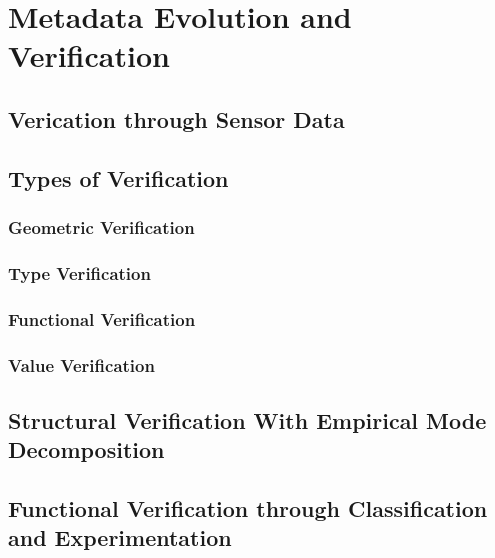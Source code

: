 

\chapter{Metadata Evolution and Verification}




\section{Verication through Sensor Data}

\section{Types of Verification}


\subsection{Geometric Verification}




\subsection{Type Verification}

\subsection{Functional Verification}




\subsection{Value Verification}

\section{Structural Verification With Empirical Mode Decomposition}






\section{Functional Verification through Classification and Experimentation}

